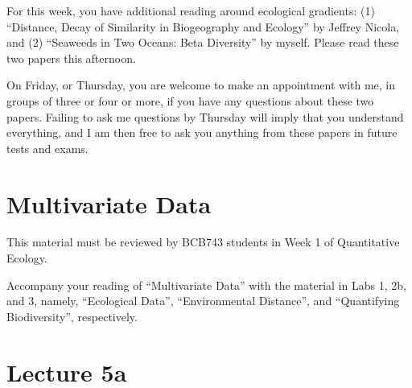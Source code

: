 \documentclass[
  10pt,
]{book}
\begin{document}
For this week, you have additional reading around ecological gradients:
(1) ``Distance, Decay of Similarity in Biogeography and Ecology'' by
Jeffrey Nicola, and (2) ``Seaweeds in Two Oceans: Beta Diversity'' by
myself. Please read these two papers this afternoon.

On Friday, or Thursday, you are welcome to make an appointment with me,
in groups of three or four or more, if you have any questions about
these two papers. Failing to ask me questions by Thursday will imply
that you understand everything, and I am then free to ask you anything
from these papers in future tests and exams.

\chapter{Multivariate Data}\label{sec-lect5}

\begin{tcolorbox}[enhanced jigsaw, colframe=quarto-callout-note-color-frame, opacityback=0, leftrule=.75mm, toprule=.15mm, rightrule=.15mm, bottomtitle=1mm, toptitle=1mm, colback=white, title=\textcolor{quarto-callout-note-color}{\faInfo}\hspace{0.5em}{BCB743}, titlerule=0mm, breakable, bottomrule=.15mm, left=2mm, arc=.35mm, coltitle=black, opacitybacktitle=0.6, colbacktitle=quarto-callout-note-color!10!white]

This material must be reviewed by BCB743 students in Week 1 of
Quantitative Ecology.

\end{tcolorbox}

\begin{tcolorbox}[enhanced jigsaw, colframe=quarto-callout-note-color-frame, opacityback=0, leftrule=.75mm, toprule=.15mm, rightrule=.15mm, bottomtitle=1mm, toptitle=1mm, colback=white, title=\textcolor{quarto-callout-note-color}{\faInfo}\hspace{0.5em}{Also see:}, titlerule=0mm, breakable, bottomrule=.15mm, left=2mm, arc=.35mm, coltitle=black, opacitybacktitle=0.6, colbacktitle=quarto-callout-note-color!10!white]

Accompany your reading of ``Multivariate Data'' with the material in
Labs 1, 2b, and 3, namely, ``Ecological Data'', ``Environmental
Distance'', and ``Quantifying Biodiversity'', respectively.

\end{tcolorbox}

\chapter*{Lecture 5a}\label{lecture-5a}
\end{document}
